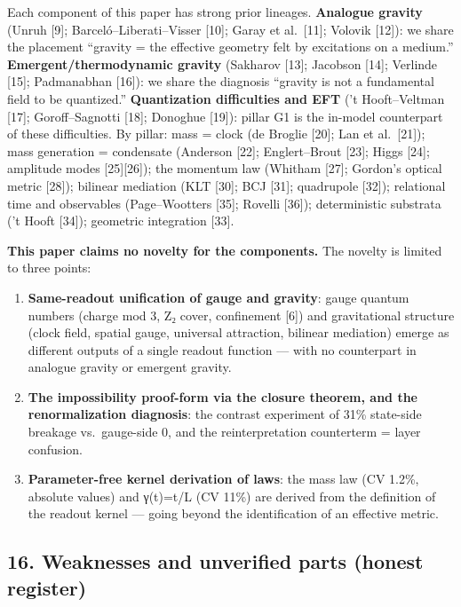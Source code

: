 \documentclass[
]{article}
\providecommand{\tightlist}{%
  \setlength{\itemsep}{0pt}\setlength{\parskip}{0pt}}
\begin{document}
Each component of this paper has strong prior lineages. \textbf{Analogue
gravity} (Unruh {[}9{]}; Barceló--Liberati--Visser {[}10{]}; Garay et
al.~{[}11{]}; Volovik {[}12{]}): we share the placement ``gravity = the
effective geometry felt by excitations on a medium.''
\textbf{Emergent/thermodynamic gravity} (Sakharov {[}13{]}; Jacobson
{[}14{]}; Verlinde {[}15{]}; Padmanabhan {[}16{]}): we share the
diagnosis ``gravity is not a fundamental field to be quantized.''
\textbf{Quantization difficulties and EFT} ('t Hooft--Veltman {[}17{]};
Goroff--Sagnotti {[}18{]}; Donoghue {[}19{]}): pillar G1 is the in-model
counterpart of these difficulties. By pillar: mass = clock (de Broglie
{[}20{]}; Lan et al.~{[}21{]}); mass generation = condensate (Anderson
{[}22{]}; Englert--Brout {[}23{]}; Higgs {[}24{]}; amplitude modes
{[}25{]}{[}26{]}); the momentum law (Whitham {[}27{]}; Gordon's optical
metric {[}28{]}); bilinear mediation (KLT {[}30{]}; BCJ {[}31{]};
quadrupole {[}32{]}); relational time and observables (Page--Wootters
{[}35{]}; Rovelli {[}36{]}); deterministic substrata ('t Hooft
{[}34{]}); geometric integration {[}33{]}.

\textbf{This paper claims no novelty for the components.} The novelty is
limited to three points:

\begin{enumerate}
\def\labelenumi{\arabic{enumi}.}
\tightlist
\item
  \textbf{Same-readout unification of gauge and gravity}: gauge quantum
  numbers (charge mod 3, Z₂ cover, confinement {[}6{]}) and
  gravitational structure (clock field, spatial gauge, universal
  attraction, bilinear mediation) emerge as different outputs of a
  single readout function --- with no counterpart in analogue gravity or
  emergent gravity.
\item
  \textbf{The impossibility proof-form via the closure theorem, and the
  renormalization diagnosis}: the contrast experiment of 31\% state-side
  breakage vs.~gauge-side 0, and the reinterpretation counterterm =
  layer confusion.
\item
  \textbf{Parameter-free kernel derivation of laws}: the mass law (CV
  1.2\%, absolute values) and γ(t)=t/L (CV 11\%) are derived from the
  definition of the readout kernel --- going beyond the identification
  of an effective metric.
\end{enumerate}

\subsection{16. Weaknesses and unverified parts (honest
register)}\label{weaknesses-and-unverified-parts-honest-register}
\end{document}
